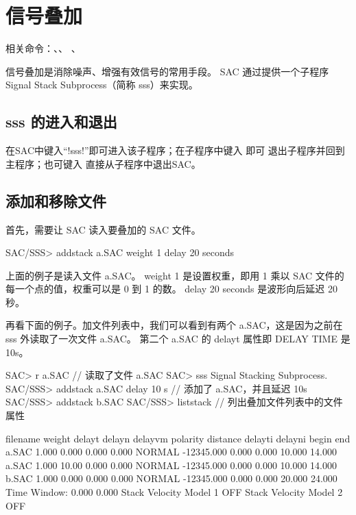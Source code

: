\section{信号叠加}
\label{sec:stack-traces}
相关命令：、、
、

信号叠加是消除噪声、增强有效信号的常用手段。
SAC 通过提供一个子程序 Signal Stack Subprocess（简称 sss）来实现。

\subsection{sss 的进入和退出}
在SAC中键入``!sss!''即可进入该子程序；在子程序中键入  即可
退出子程序并回到主程序；也可键入  直接从子程序中退出SAC。

\subsection{添加和移除文件}

首先，需要让 SAC 读入要叠加的 SAC 文件。

\begin{SACCode}
SAC/SSS> addstack a.SAC weight 1 delay 20 seconds
\end{SACCode}

上面的例子是读入文件 a.SAC。
weight 1 是设置权重，即用 1 乘以 SAC 文件的每一个点的值，权重可以是 0 到 1 的数。
delay 20 seconds 是波形向后延迟 20 秒。

再看下面的例子。加文件列表中，我们可以看到有两个 a.SAC，这是因为之前在 sss 外读取了一次文件 a.SAC。
第二个 a.SAC 的 delayt 属性即 DELAY TIME 是 10s。

\begin{SACCode}
SAC> r a.SAC    // 读取了文件 a.SAC
SAC> sss
Signal Stacking Subprocess.
SAC/SSS> addstack a.SAC delay 10 s    // 添加了 a.SAC，并且延迟 10s
SAC/SSS> addstack b.SAC
SAC/SSS> liststack    // 列出叠加文件列表中的文件属性

 filename  weight      delayt      delayn     delayvm   polarity   distance
                           delayti     delayni      begin       end
 a.SAC         1.000       0.000       0.000       0.000   NORMAL   -12345.000
                             0.000       0.000      10.000      14.000
 a.SAC         1.000       10.00       0.000       0.000   NORMAL   -12345.000
                             0.000       0.000      10.000      14.000
 b.SAC         1.000       0.000       0.000       0.000   NORMAL   -12345.000
                             0.000       0.000      20.000      24.000
 Time Window:       0.000       0.000
 Stack Velocity Model 1 OFF
 Stack Velocity Model 2 OFF
\end{SACCode}

